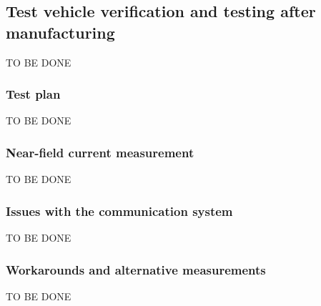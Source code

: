 \subsection{Test vehicle verification and testing after manufacturing}
\label{sec:test-vehicle-testing}

TO BE DONE

\subsubsection{Test plan}

TO BE DONE

\subsubsection{Near-field current measurement}

TO BE DONE

\subsubsection{Issues with the communication system}

TO BE DONE

\subsubsection{Workarounds and alternative measurements}

TO BE DONE
